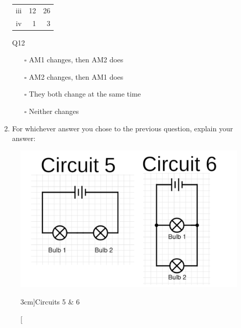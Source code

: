 \documentclass[a4paper,openany,nobib]{tufte-book}
\newcommand{\Qline}[1]{\noindent\rule{#1}{0.6pt}}
\newcounter{ql}
\newcommand{\Qlines}[1]{\forloop{ql}{0}{\value{ql}<#1}{\vskip0em\Qline{\linewidth}}}
\begin{document}
\begin{enumerate}
\begin{margintable}
\begin{center}
\begin{tabular}{crr}
		 iii & 12 & 26\\
		 iv & 1 & 3\\
		 \bottomrule
		\end{tabular}
		\caption{\centering Q12}
		\end{center}
		\end{margintable}
		\begin{itemize}
			\item[$\square$] AM1 changes, then AM2 does
			\item[$\square$] AM2 changes, then AM1 does
			\item[$\square$] They both change at the same time
			\item[$\square$] Neither changes
		\end{itemize}
\item For whichever answer you chose to the previous question, explain your answer:
		\Qlines{2}
\end{enumerate}
\newpage
{}
\begin{figure}[h!]
	\center
	\includegraphics[width=\linewidth]{comp}
	\caption[][3cm]{Circuits 5 \& 6}
\end{figure}
\end{document}
